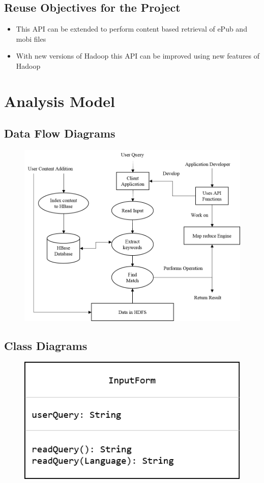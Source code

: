 \documentclass[11pt,letterpaper]{article}
\begin{document}
\subsection{Reuse Objectives for the Project}
\begin{itemize}
\item This API can be extended to perform content based retrieval of  ePub and mobi files
\item With new versions of Hadoop this API can be improved using new features of Hadoop
\end{itemize}

\newpage

\section{Analysis Model}

\subsection{Data Flow Diagrams}
\begin{figure}[H]
\includegraphics{data_flow}
\centering
\end{figure}

\newpage

\subsection{Class Diagrams}
\begin{figure}[H]
\includegraphics{class_input_form}
\centering
\end{figure}
\end{document}
